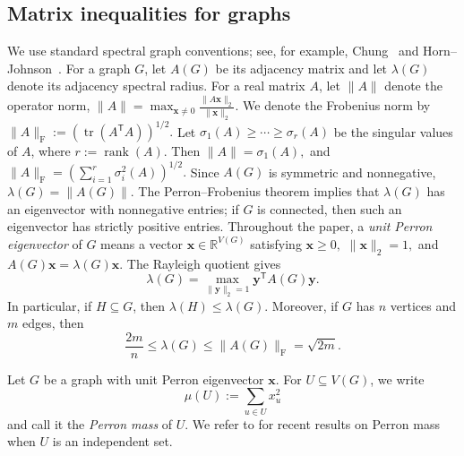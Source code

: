 \documentclass[10pt,a4paper]{amsart}
\begin{document}
\subsection{Matrix inequalities for graphs}
\label{subsec:prelim-spectral}

We use standard spectral graph conventions; see, for example,
Chung~\cite{Chung1997SpectralGraphTheory} and
Horn--Johnson~\cite{HornJohnson2012MatrixAnalysis}.  For a graph \(G\),
let \(A(G)\) be its adjacency matrix and let \(\lambda(G)\) denote its
adjacency spectral radius.  For a real matrix \(A\), let \(\|A\|\) denote
the operator norm, $\|A\|
        =
        \max_{\bm{x}\neq 0}
        \frac{\|A\bm{x}\|_2}{\|\bm{x}\|_2}.$
We denote the Frobenius norm by $\|A\|_{\mathrm F}
        :=
    (\operatorname{tr}(A^{\mathsf T}A) )^{1/2}.$
Let $\sigma_1(A)\ge \cdots \ge \sigma_r(A)$
be the singular values of \(A\), where \(r:=\operatorname{rank}(A)\).
Then $\|A\|=\sigma_1(A),$ and $
        \|A\|_{\mathrm F}
=(\sum_{i=1}^r\sigma_i^2(A))^{1/2}.$
Since \(A(G)\) is symmetric and nonnegative, \(\lambda(G)=\|A(G)\|\).
The Perron--Frobenius theorem implies that \(\lambda(G)\) has an
eigenvector with nonnegative entries; if \(G\) is connected, then such an
eigenvector has strictly positive entries.  Throughout the paper, a
\emph{unit Perron eigenvector} of \(G\) means a vector
\(\bm{x}\in\mathbb R^{V(G)}\) satisfying
$\bm{x}\ge 0,$ $
        \|\bm{x}\|_2=1,$ and $
        A(G)\bm{x}=\lambda(G)\bm{x}.$ The Rayleigh quotient gives
\[
        \lambda(G)
        =
        \max_{\|\bm{y}\|_2=1}
        \bm{y}^{\mathsf T}A(G)\bm{y}.
\]
In particular, if \(H\subseteq G\), then \(\lambda(H)\le \lambda(G)\).
Moreover, if \(G\) has \(n\) vertices and \(m\) edges, then
\[
        \frac{2m}{n}\le \lambda(G)\le \|A(G)\|_{\mathrm F}=\sqrt{2m}.
\]

Let \(G\) be a graph with unit Perron eigenvector \(\bm{x}\).  For
\(U\subseteq V(G)\), we write
\[
        \mu(U):=\sum_{u\in U}x_u^2
\]
and call it the \emph{Perron mass} of \(U\).  We refer to
\cite{LiuNing2026, CLLLN2026} for recent results on Perron mass when
\(U\) is an independent set.
\end{document}
